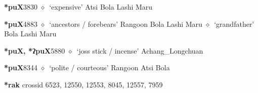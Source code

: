   \begin{list}{}{\leftmargin=1.5em \itemindent=-1.5em}
  \item {\footnotesize \textbf{*puX}}{\tiny 3830}
         $\diamond$~`expensive'
         Atsi 
\hspace{1ex}
         Bola 
\hspace{1ex}
         Lashi 
\hspace{1ex}
         Maru 
  \item {\footnotesize \textbf{*puX}}{\tiny 4883}
\hspace{1ex}
         $\diamond$~`ancestors / forebears'
         Rangoon 
\hspace{1ex}
         Bola 
\hspace{1ex}
         Lashi 
\hspace{1ex}
         Maru 
\hspace{1ex}
         $\diamond$~`grandfather'
         Bola 
\hspace{1ex}
         Lashi 
\hspace{1ex}
         Maru 
  \item {\footnotesize \textbf{*puX, *ʔpuX}}{\tiny 5880}
\hspace{1ex}
         $\diamond$~`joss stick / incense'
         Achang\_Longchuan 
  \item {\footnotesize \textbf{*puX}}{\tiny 8344}
\hspace{1ex}
         $\diamond$~`polite / courteous'
         Rangoon 
\hspace{1ex}
         Atsi 
\hspace{1ex}
         Bola 
  \end{list}
\item
\textbf{*rak}
  {\tiny crossid 6523, 12550, 12553, 8045, 12557, 7959}
